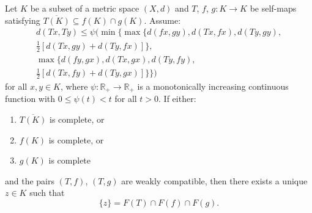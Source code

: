 \documentclass[10pt,a4paper]{amsart}
\begin{document}
\begin{theorem} \label{Thrm 3.1}
Let $K$ be a subset of a metric space $(X,d)$ and $T$, $f$, $g: K \to K$ be self-maps satisfying $\overline{T(K)} \subseteq f(K) \cap g(K)$. Assume:
\begin{multline} \label{(3.1.1)}
d(Tx,Ty) \leq \psi\Bigg(\min\Bigg\{\max\Big\{d(fx,gy),d(Tx,fx),d(Ty,gy),\\
\tfrac{1}{2}\left[d(Tx,gy) + d(Ty,fx)\right]\Big\}, \\
\max\Big\{d(fy,gx),d(Tx,gx),d(Ty,fy),\\
\tfrac{1}{2}\left[d(Tx,fy) + d(Ty,gx)\right]\Big\}\Bigg\}\Bigg)
\end{multline}
for all $x,y \in K$, where $\psi: \mathbb{R}_{+} \to \mathbb{R}_{+}$ is a monotonically increasing continuous function with $0 \leq \psi(t) < t$ for all $t > 0$. If either:
\begin{enumerate}
    \item[(i)] $\overline{T(K)}$ is complete, or
    \item[(ii)] $f(K)$ is complete, or
    \item[(iii)] $g(K)$ is complete
\end{enumerate}
and the pairs $(T,f)$, $(T,g)$ are weakly compatible, then there exists a unique $z \in K$ such that
\[
\{z\} = F(T) \cap F(f) \cap F(g).
\]
\end{theorem}
\end{document}
